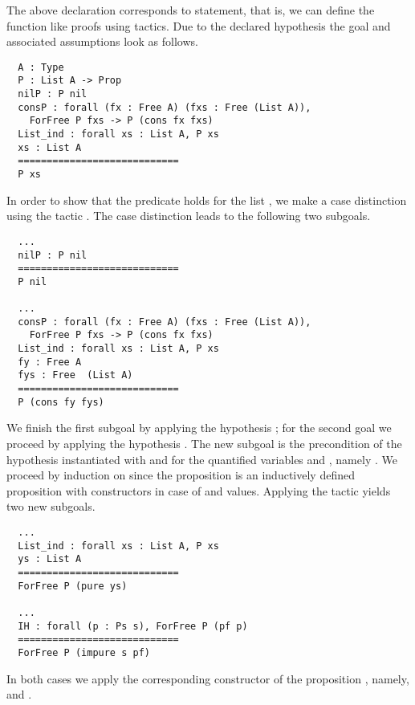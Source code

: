 \noindent%
The above declaration corresponds to  statement, that is, we can define the function like proofs using tactics.
Due to the declared hypothesis the goal and associated assumptions look as follows.

\begin{verbatim}
  A : Type
  P : List A -> Prop
  nilP : P nil
  consP : forall (fx : Free A) (fxs : Free (List A)),
    ForFree P fxs -> P (cons fx fxs)
  List_ind : forall xs : List A, P xs
  xs : List A
  ============================
  P xs
\end{verbatim}

In order to show that the predicate  holds for the list , we make a case distinction using the tactic . The case distinction leads to the following two subgoals.

\begin{verbatim}
  ...
  nilP : P nil
  ============================
  P nil

  ...
  consP : forall (fx : Free A) (fxs : Free (List A)),
    ForFree P fxs -> P (cons fx fxs)
  List_ind : forall xs : List A, P xs
  fy : Free A
  fys : Free  (List A)
  ============================
  P (cons fy fys)
\end{verbatim}

We finish the first subgoal by applying the hypothesis ; for the second goal we proceed by applying the hypothesis .
The new subgoal is the precondition of the hypothesis  instantiated with  and  for the quantified variables  and , namely .
We proceed by induction on  since the proposition  is an inductively defined proposition with constructors in case of  and  values.
Applying the tactic  yields two new subgoals.

\begin{verbatim}
  ...
  List_ind : forall xs : List A, P xs
  ys : List A
  ============================
  ForFree P (pure ys)

  ...
  IH : forall (p : Ps s), ForFree P (pf p)
  ============================
  ForFree P (impure s pf)
\end{verbatim}

In both cases we apply the corresponding constructor of the proposition , namely,  and .

